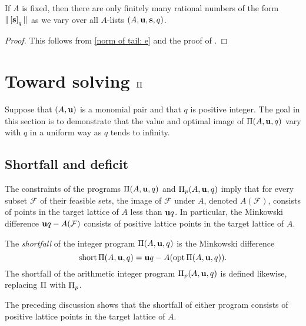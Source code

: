 \documentclass[11pt]{amsart}
\newcommand{\short}{\operatorname{short}}
\begin{document}
\begin{corollary}\label{finitely many coord sums: C}
   If $A$ is fixed, then there are only finitely many rational numbers of the form $ \| \left[ \mathbf{s} \right]_q \|$ as we vary over all $A$-lists $(A, \mathbf{u}, \mathbf{s}, q)$.
\end{corollary}

\begin{proof}
   This follows from \eqref{norm of tail: e} and the proof of .
\end{proof}

\newpage
\section{Toward solving $\Pi$}
\label{solving: S}

Suppose that $(A, \mathbf{u})$ is a monomial pair and that $q$ is positive integer.
The goal in this section is to demonstrate that the value and optimal image of $\Pi(A, \mathbf{u}, q)$ vary with $q$ in a uniform way as $q$ tends to infinity.

\subsection{Shortfall and deficit}

The constraints of the programs $\Pi(A,\mathbf{u},q)$ and $\Pi_p(A,\mathbf{u},q)$ imply that for every subset $\mathcal{F}$ of their feasible sets, the image of $\mathcal{F}$ under $A$, denoted $A(\mathcal{F})$, consists of points in the target lattice of $A$ less than $\mathbf{u}q$.
In particular, the Minkowski difference $\mathbf{u}q-A(\mathcal{F})$ consists of positive lattice points in the target lattice of $A$.

\begin{definition}
   The \emph{shortfall} of the integer program $\Pi(A, \mathbf{u}, q)$ is the Minkowski difference
   \[ \short \IP(A, \vv{u}, q) = \vv{u}q - A( \opt \IP(A, \vv{u}, q)).\]
   The shortfall of the arithmetic integer program $\Pi_p(A, \mathbf{u}, q)$ is defined likewise, replacing $\Pi$ with $\Pi_p$.
\end{definition}

The preceding discussion shows that the shortfall of either program consists of positive lattice points in the target lattice of $A$.
\end{document}
